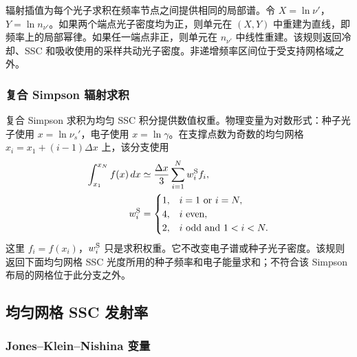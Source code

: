 \documentclass[twocolumn]{aastex702}
\begin{document}
辐射插值为每个光子求积在频率节点之间提供相同的局部谱。令 \(X=\ln\nu'\)，\(Y=\ln n_{\nu'}\)。如果两个端点光子密度均为正，则单元在 \((X,Y)\) 中重建为直线，即频率上的局部幂律。如果任一端点非正，则单元在 \(n_{\nu'}\) 中线性重建。该规则返回冷却、SSC 和吸收使用的采样共动光子密度。非递增频率区间位于受支持网格域之外。

\subsubsection{复合 Simpson 辐射求积}

复合 Simpson 求积为均匀 SSC 积分提供数值权重。物理变量为对数形式：种子光子使用 \(x=\ln\nu_s'\)，电子使用 \(x=\ln\gamma\)。在支撑点数为奇数的均匀网格 \(x_i=x_1+(i-1)\Delta x\) 上，该分支使用
\begin{equation}
\begin{aligned}
\int_{x_1}^{x_N} f(x)\,dx
&\simeq
\frac{\Delta x}{3}\sum_{i=1}^{N}w_i^{\rm S} f_i,\\
w_i^{\rm S}
&=
\begin{cases}
1, & i=1 \ \text{or}\ i=N,\\
4, & i \ \text{even},\\
2, & i \ \text{odd and}\ 1<i<N .
\end{cases}
\end{aligned}
\end{equation}
这里 \(f_i=f(x_i)\)，\(w_i^{\rm S}\) 只是求积权重。它不改变电子谱或种子光子密度。该规则返回下面均匀网格 SSC 光度所用的种子频率和电子能量求和；不符合该 Simpson 布局的网格位于此分支之外。

\subsection{均匀网格 SSC 发射率}

\subsubsection{Jones--Klein--Nishina 变量}
\end{document}
